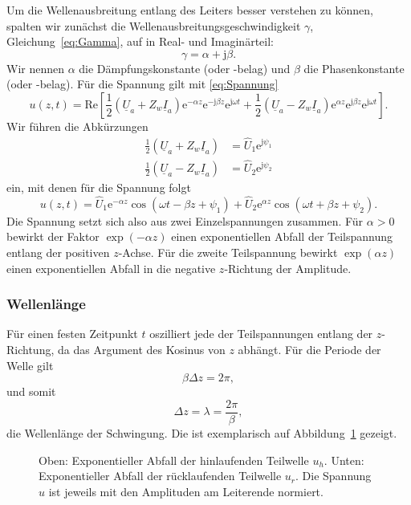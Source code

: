 \documentclass[paper=a4, parskip=half-, ngerman, fontsize=11pt]{scrreprt}
\begin{document}
Um die Wellenausbreitung entlang des Leiters besser verstehen zu können, spalten wir zunächst die
Wellenausbreitungsgeschwindigkeit $\gamma$, Gleichung~\eqref{eq:Gamma}, auf in Real- und Imaginärteil:
\[ \gamma = \alpha + \mathrm{j} \beta. \] Wir nennen $\alpha$ die Dämpfungskonstante (oder -belag) und $\beta$ die
Phasenkonstante (oder -belag). Für die Spannung gilt mit \eqref{eq:Spannung}
\begin{equation*}
u(z, t) = \mathrm{Re} \left[
\frac{1}{2} \left( \underline{U}_{a} + Z_{w} \underline{I}_{a} \right) \mathrm{e}^{- \alpha z}
\mathrm{e}^{- \mathrm{j} \beta z} \mathrm{e}^{\mathrm{j} \omega t}
+
\frac{1}{2} \left( \underline{U}_{a} - Z_{w} \underline{I}_{a} \right) \mathrm{e}^{\alpha z}
\mathrm{e}^{\mathrm{j} \beta z} \mathrm{e}^{\mathrm{j} \omega t}
\right].
\end{equation*}
Wir führen die Abkürzungen
\begin{align*}
\frac{1}{2} \left( \underline{U}_{a} + Z_{w} \underline{I}_{a} \right) &= \hat{U}_{1} \mathrm{e}^{\mathrm{j} \psi_{1}}
\\[1ex]
\frac{1}{2} \left( \underline{U}_{a} - Z_{w} \underline{I}_{a} \right) &= \hat{U}_{2} \mathrm{e}^{\mathrm{j} \psi_{2}}
\end{align*}
ein, mit denen für die Spannung folgt
\begin{equation*}
u(z,t) =
\hat{U}_{1} \mathrm{e}^{- \alpha z} \cos \left( \omega t - \beta z + \psi_{1} \right)
+
\hat{U}_{2} \mathrm{e}^{\alpha z} \cos \left( \omega t + \beta z + \psi_{2} \right).
\end{equation*}
Die Spannung setzt sich also aus zwei Einzelspannungen zusammen. Für $\alpha > 0$ bewirkt der Faktor $\exp(-\alpha z)$
einen exponentiellen Abfall der Teilspannung entlang der positiven $z$-Achse. Für die zweite Teilspannung bewirkt
$\exp(\alpha z)$ einen exponentiellen Abfall in die negative $z$-Richtung der Amplitude.

\subsubsection{Wellenlänge}

Für einen festen Zeitpunkt $t$ oszilliert jede der Teilspannungen entlang der $z$-Richtung, da das Argument des Kosinus
von $z$ abhängt. Für die Periode der Welle gilt \[ \beta \Delta z = 2 \pi, \] und somit
\[ \Delta z = \lambda = \frac{2 \pi}{\beta}, \] die Wellenlänge der Schwingung. Die ist exemplarisch auf
Abbildung~\ref{ExpWelle} gezeigt.
\begin{figure}[!htb]
    \begin{center}
        
        \caption{Oben: Exponentieller Abfall der hinlaufenden Teilwelle $u_{h}$. Unten: Exponentieller Abfall der
        rücklaufenden Teilwelle $u_{r}$. Die Spannung $u$ ist jeweils mit den Amplituden am Leiterende normiert.}
        \label{ExpWelle}
    \end{center}
\end{figure}
\end{document}

